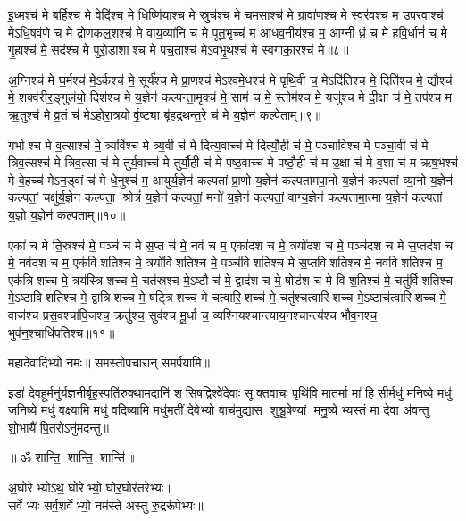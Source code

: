 इ॒ध्मश्च॑ मे ब॒र्हिश्च॑ मे॒ वेदि॑श्च मे॒ धिष्णि॑याश्च मे॒ स्रुच॑श्च मे चम॒साश्च॑ मे॒ ग्रावा॑णश्च मे॒ स्वर॑वश्च म उपर॒वाश्च॑ मेऽधि॒षव॑णे च मे द्रोणकल॒शश्च॑ मे वाय॒व्या॑नि च मे पूत॒भृच्च॑ म आधव॒नीय॑श्च म॒ आग्नीध्रं च मे हवि॒र्धानं॑ च मे गृ॒हाश्च॑ मे॒ सद॑श्च मे पुरो॒डाशाश्च मे पच॒ताश्च॑ मेऽवभृ॒थश्च॑ मे स्वगाका॒रश्च॑ मे॥८॥ 

अ॒ग्निश्च॑ मे घ॒र्मश्च॑ मे॒ऽर्कश्च॑ मे॒ सूर्य॑श्च मे प्रा॒णश्च॑ मेऽश्वमे॒धश्च॑ मे पृथि॒वी च॒ मेऽदि॑तिश्च मे॒ दिति॑श्च मे॒ द्यौश्च॑ मे॒ शक्व॑रीर॒ङ्गुल॑यो॒ दिश॑श्च मे य॒ज्ञेन॑ कल्पन्ता॒मृक्च॑ मे॒ साम॑ च मे॒ स्तोम॑श्च मे॒ यजु॑श्च मे दी॒क्षा च॑ मे॒ तप॑श्च म ऋ॒तुश्च॑ मे व्र॒तं च॑ मेऽहोरा॒त्रयोर्वृ॒ष्ट्या बृ॑हद्रथन्त॒रे च॑ मे य॒ज्ञेन॑ कल्पेताम्॥९॥ 

गर्भाश्च मे व॒त्साश्च॑ मे॒ त्र्यवि॑श्च मे त्र्य॒वी च॑ मे दित्य॒वाच्च॑ मे दित्यौ॒ही च॑ मे॒ पञ्चा॑विश्च मे पञ्चा॒वी च॑ मे त्रिव॒त्सश्च॑ मे त्रिव॒त्सा च॑ मे तुर्य॒वाच्च॑ मे तुर्यौ॒ही च॑ मे पष्ठ॒वाच्च॑ मे पष्ठौ॒ही च॑ म उ॒क्षा च॑ मे व॒शा च॑ म ऋष॒भश्च॑ मे वे॒हच्च॑ मेऽन॒ड्वां च॑ मे धे॒नुश्च॑ म॒ आयुर्य॒ज्ञेन॑ कल्पतां प्रा॒णो य॒ज्ञेन॑ कल्पतामपा॒नो य॒ज्ञेन॑ कल्पतां व्या॒नो य॒ज्ञेन॑ कल्पतां॒ चक्षु॑र्य॒ज्ञेन॑ कल्पता॒ श्रोत्रं॑ य॒ज्ञेन॑ कल्पतां॒ मनो॑ य॒ज्ञेन॑ कल्पतां॒ वाग्य॒ज्ञेन॑ कल्पतामा॒त्मा य॒ज्ञेन॑ कल्पतां य॒ज्ञो य॒ज्ञेन॑ कल्पताम्॥१०॥ 

एका॑ च मे ति॒स्रश्च॑ मे॒ पञ्च॑ च मे स॒प्त च॑ मे॒ नव॑ च म॒ एका॑दश च मे॒ त्रयो॑दश च मे॒ पञ्च॑दश च मे स॒प्तद॑श च मे॒ नव॑दश च म॒ एक॑विशतिश्च मे॒ त्रयो॑विशतिश्च मे॒ पञ्च॑विशतिश्च मे स॒प्तविशतिश्च मे॒ नव॑विशतिश्च म॒ एक॑त्रिशच्च मे॒ त्रय॑स्त्रिशच्च मे॒ चत॑स्रश्च मे॒ऽष्टौ च॑ मे॒ द्वाद॑श च मे॒ षोड॑श च मे विश॒तिश्च॑ मे॒ चतु॑र्विशतिश्च मे॒ऽष्टाविशतिश्च मे॒ द्वात्रिशच्च मे॒ षट्त्रिशच्च मे चत्वारि॒शच्च॑ मे॒ चतु॑श्चत्वारिशच्च मे॒ऽष्टाच॑त्वारिशच्च मे॒ वाज॑श्च प्रस॒वश्चा॑पि॒जश्च॒ क्रतु॑श्च॒ सुव॑श्च मू॒र्धा च॒ व्यश्नि॑यश्चान्त्याय॒नश्चान्त्य॑श्च भौव॒नश्च॒ भुव॑न॒श्चाधि॑पतिश्च॥११॥ 

महादेवादिभ्यो नमः॥ समस्तोपचारान् समर्पयामि॥

इडा॑ देव॒हूर्मनु॑र्यज्ञ॒नीर्बृह॒स्पति॑रुक्थाम॒दानि॑ शसिष॒द्विश्वे॑दे॒वाः सूक्त॒वाचः॒ पृथि॑वि मात॒र्मा मा॑ हिसी॒र्मधु॑ मनिष्ये॒ मधु॑ जनिष्ये॒ मधु॑ वक्ष्यामि॒ मधु॑ वदिष्यामि॒ मधु॑मतीं दे॒वेभ्यो॒ वाच॑मुद्यास शुश्रू॒षेण्यां मनु॒ष्येभ्य॒स्तं मा॑ दे॒वा अ॑वन्तु शो॒भायै॑ पि॒तरोऽनु॑मदन्तु॥ 

\centerline{॥ ॐ शान्ति॒ शान्ति॒ शान्ति॑॥}

{\small \closesection}

अ॒घोरेभ्योऽथ॒ घोरेभ्यो॒ घोर॒घोर॑तरेभ्यः।\\
सर्वेभ्यः सर्व॒शर्वेभ्यो॒ नम॑स्ते अस्तु रु॒द्ररू॑पेभ्यः॥

